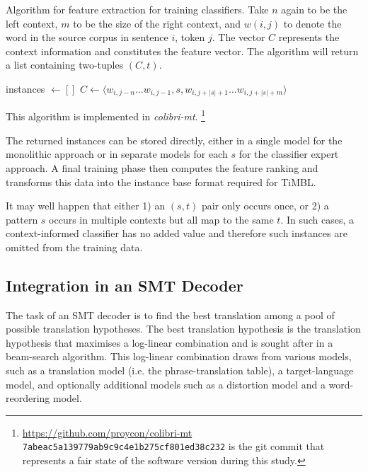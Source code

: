 \begin{algorithm}
\caption{Algorithm for feature extraction for training classifiers.  Take $n$
again to be the left context, $m$ to be the size of the right context, and
$w{(i,j)}$ to denote the word in the source corpus in sentence $i$, token $j$.
The vector $C$ represents the context information and constitutes the feature
vector.  The algorithm will return a list containing two-tuples $(C,t)$.  }
\label{alg:featureextract}
\begin{algorithmic}
\State instances $\gets []$
        \State $C \gets \langle w_{i,j-n} \ldots w_{i,j-1}, s, w_{i,j+|s|+1} \ldots w_{i,j+|s|+m} \rangle$
        \State {} 
      \EndFor
  \EndFor
\EndFor \\
\end{algorithmic}
\end{algorithm}
    
\noindent
This algorithm is implemented in \emph{colibri-mt}.
\footnote{\url{https://github.com/proycon/colibri-mt} \\ \texttt{7abeac5a139779ab9c9c4e1b275cf801ed38c232} is the git commit that represents a fair state of the software version during this study.}

The returned instances can be stored directly, either in a single model for the
monolithic approach or in separate models for each $s$ for the classifier
expert approach. A final training phase then computes the feature ranking and
transforms this data into the instance base format required for TiMBL.

It may well happen that either 1) an $(s,t)$ pair only occurs once, or
2) a pattern $s$ occurs in multiple contexts but all map to the same
$t$. In such cases, a context-informed classifier has no added value
and therefore such instances are omitted from the training data.

\subsection{Integration in an SMT Decoder}
\label{sec:smtintegration}

The task of an SMT decoder is to find the best translation among a pool
of possible translation hypotheses. The best translation hypothesis is the
translation hypothesis that maximises a log-linear combination and is sought
after in a beam-search algorithm. This log-linear combination draws from
various models, such as a translation model (i.e. the phrase-translation
table), a target-language model, and optionally additional models such as a
distortion model and a word-reordering model. 

